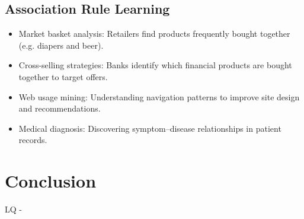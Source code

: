 \documentclass[conference]{IEEEtran}
\begin{document}
\subsection{Association Rule Learning}
\begin{itemize}
    \item Market basket analysis: Retailers find products frequently bought together (e.g. diapers and beer).
    
    \item Cross-selling strategies: Banks identify which financial products are bought together to target offers.
    
    \item Web usage mining: Understanding navigation patterns to improve site design and recommendations.
    
    \item Medical diagnosis: Discovering symptom–disease relationships in patient records.
\end{itemize}

\section{Conclusion}
LQ - 















%
%
%


\end{document}

